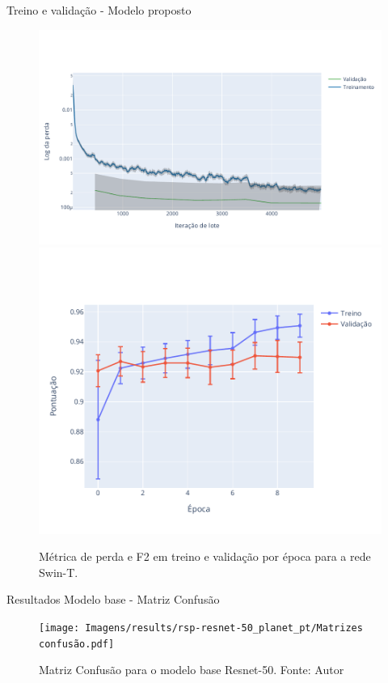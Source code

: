 \documentclass[8pt]{beamer}
\begin{document}
\begin{frame}{Treino e validação - Modelo proposto}    
\begin{figure}[!ht]
    \centering
    \includegraphics[width=0.55\columnwidth]{Imagens/results/rsp-resnet-50_planet_pt/Training Loss Per Minibatch.pdf}
    \label{fig:LossTrainSwin}
    \centering
    \includegraphics[width=0.40\columnwidth]{Imagens/results/rsp-swin-t_planet_pt/Pontuação em treino e validação por época.pdf}
    \caption{ Métrica de perda e F2 em treino e validação por época para a rede Swin-T.}
    \label{fig:PontuacaoTrainSwin}
\end{figure}  

\end{frame}



\begin{frame}{Resultados Modelo base - Matriz Confusão}
    \begin{figure}[!ht]
        \centering
        \texttt{[image: Imagens/results/rsp-resnet-50\_planet\_pt/Matrizes confusão.pdf]}
        \caption{ Matriz Confusão para o modelo base Resnet-50. Fonte: Autor}
        \label{fig:Matriz Confusao Resnet50}
    \end{figure}     
\end{frame}     
\end{document}
